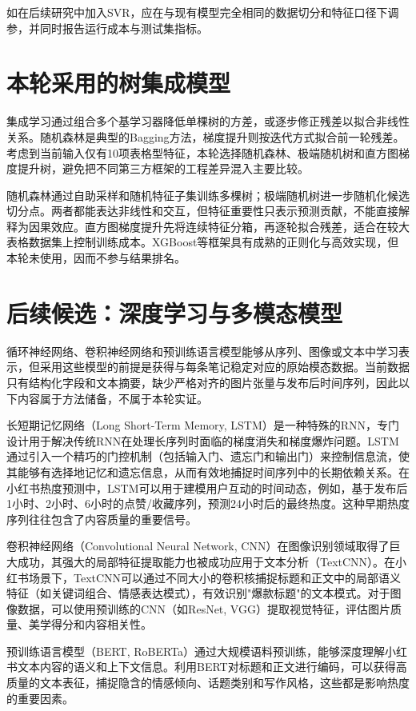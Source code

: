 如在后续研究中加入SVR，应在与现有模型完全相同的数据切分和特征口径下调参，并同时报告运行成本与测试集指标。

\section{本轮采用的树集成模型}

集成学习通过组合多个基学习器降低单棵树的方差，或逐步修正残差以拟合非线性关系。随机森林是典型的Bagging方法\cite{Breiman2001}，梯度提升则按迭代方式拟合前一轮残差。考虑到当前输入仅有10项表格型特征，本轮选择随机森林、极端随机树和直方图梯度提升树，避免把不同第三方框架的工程差异混入主要比较。

随机森林通过自助采样和随机特征子集训练多棵树；极端随机树进一步随机化候选切分点。两者都能表达非线性和交互，但特征重要性只表示预测贡献，不能直接解释为因果效应。直方图梯度提升先将连续特征分箱，再逐轮拟合残差，适合在较大表格数据集上控制训练成本。XGBoost等框架具有成熟的正则化与高效实现\cite{ChenGuestrin2016}，但本轮未使用，因而不参与结果排名。

\section{后续候选：深度学习与多模态模型}

循环神经网络、卷积神经网络和预训练语言模型能够从序列、图像或文本中学习表示，但采用这些模型的前提是获得与每条笔记稳定对应的原始模态数据。当前数据只有结构化字段和文本摘要，缺少严格对齐的图片张量与发布后时间序列，因此以下内容属于方法储备，不属于本轮实证。

长短期记忆网络（Long Short-Term Memory, LSTM）是一种特殊的RNN，专门设计用于解决传统RNN在处理长序列时面临的梯度消失和梯度爆炸问题。LSTM通过引入一个精巧的门控机制（包括输入门、遗忘门和输出门）来控制信息流，使其能够有选择地记忆和遗忘信息，从而有效地捕捉时间序列中的长期依赖关系。在小红书热度预测中，LSTM可以用于建模用户互动的时间动态，例如，基于发布后1小时、2小时、6小时的点赞/收藏序列，预测24小时后的最终热度。这种早期热度序列往往包含了内容质量的重要信号。

卷积神经网络（Convolutional Neural Network, CNN）在图像识别领域取得了巨大成功，其强大的局部特征提取能力也被成功应用于文本分析（TextCNN）。在小红书场景下，TextCNN可以通过不同大小的卷积核捕捉标题和正文中的局部语义特征（如关键词组合、情感表达模式），有效识别"爆款标题"的文本模式。对于图像数据，可以使用预训练的CNN（如ResNet, VGG）提取视觉特征，评估图片质量、美学得分和内容相关性。

预训练语言模型（BERT, RoBERTa）通过大规模语料预训练，能够深度理解小红书文本内容的语义和上下文信息。利用BERT对标题和正文进行编码，可以获得高质量的文本表征，捕捉隐含的情感倾向、话题类别和写作风格，这些都是影响热度的重要因素。

